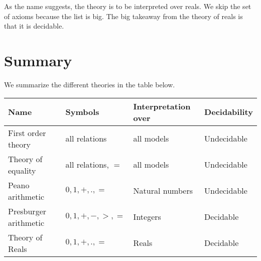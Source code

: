 As the name suggests, the theory is to be interpreted over reals. We skip the set of axioms because the list is big. The big takeaway from the theory of reals is that it is decidable. 

\section{Summary}
We summarize the different theories in the table below.

\begin{table}[H]
\centering
\begin{tabular}{l|l|l|l}
Name & Symbols & Interpretation over & Decidability \\
\hline
First order theory & all relations & all models & Undecidable \\
Theory of equality & all relations, $=$ & all models & Undecidable \\
Peano arithmetic & $0,1,+,.,=$ & Natural numbers & Undecidable \\
Presburger arithmetic & $0,1,+,-,>,=$ & Integers & Decidable \\
Theory of Reals & $0,1,+,.,=$ & Reals & Decidable \\
\end{tabular}
\end{table}



